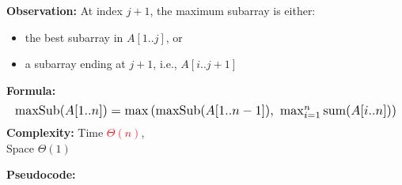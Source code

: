 \documentclass[a4paper,landscape]{article}
\newcommand{\timecomplexity}[1]{\textcolor{red}{#1}}
\begin{document}
\begin{multicols}{7}
\textbf{Observation:}
At index \( j+1 \), the maximum subarray is either:
\begin{itemize}[noitemsep,itemsep=0pt]
    \item the best subarray in \( A[1..j] \), or
    \item a subarray ending at \( j+1 \), i.e., \( A[i..j+1] \)
\end{itemize}
\textbf{Formula:}
\[
\resizebox{1\textwidth}{!}{$
    \text{maxSub}(A[1..n]) = \max\left(
    \text{maxSub}(A[1..n-1]),\ 
    \max_{i=1}^{n} \text{sum}(A[i..n])
    \right)
$}
\]
\textbf{Complexity:} Time \timecomplexity{\( \Theta(n) \)}, \\Space \( \Theta(1) \)

\textbf{Pseudocode:}


\end{multicols}
\end{document}
